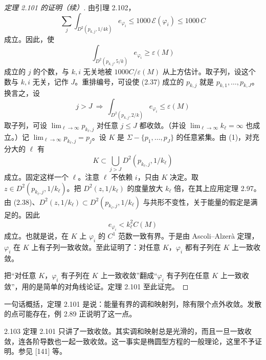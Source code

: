 \begin{proof}[定理 2.101 的证明（续）]
  由引理 2.102，
\[
  \sum_j\int_{D^2(p_{k,j},1/4k)}e_{\varphi_i}\le1000\,\mathcal{E}(\varphi_i)\le1000\,C
\]
成立。因此，使
\begin{equation}
  \int_{D^2(p_{k,j},5/k)}e_{\varphi_i}\ge\varepsilon(M) \tag{2.37}
\end{equation}
成立的 $j$ 的个数，与 $k,i$ 无关地被 $1000C/\varepsilon(M)$ 从上方估计。取子列，设这个数与 $k,i$ 无关，记作 $J$。重排编号，可设使 (2.37) 成立的 $p_{k,j}$ 就是 $p_{k,1},\dots,p_{k,J}$。换言之，设
\begin{equation}
  j>J\ \Longrightarrow\ \int_{D^2(p_{k,j},2/k)}e_{\varphi_i}\le\varepsilon(M) \tag{2.38}
\end{equation}
取子列，可设 $\lim_{\ell\to\infty}p_{k_\ell,j}$ 对任意 $j\le J$ 都收敛。（并设 $\lim_{\ell\to\infty}k_\ell=\infty$ 也成立。）记 $\lim_{\ell\to\infty}p_{k_\ell,j}=p_j$。设 $K$ 是 $\Sigma-\{p_1,\dots,p_J\}$ 的任意紧集。由 (1)，对充分大的 $\ell$ 有
\[
  K\subset\bigcup_{j>J}D^2(p_{k_\ell,j},1/k_\ell)
\]
成立。固定这样一个 $\ell$。注意 $\ell$ 不依赖 $i$，只由 $K$ 决定。取 $z\in D^2(p_{k_\ell,j},1/k_\ell)$。把 $D^2(z,1/k_\ell)$ 的度量放大 $k_\ell$ 倍，在其上应用定理 2.97。由 (2.38)、$D^2(z,1/k_\ell)\subset D^2(p_{k_\ell,j},1/k_\ell)$ 与共形不变性，关于能量的假定是满足的。因此
\[
  e_{\varphi_i}<k_\ell^2C(M)
\]
成立。也就是说，在 $K$ 上 $\varphi_i$ 的 $C^1$ 范数一致有界。于是由 Ascoli–Alzerà 定理，$\varphi_i$ 在 $K$ 上有子列一致收敛。至此证明了：对任意 $K$，$\varphi_i$ 都有子列在 $K$ 上一致收敛。


把“对任意 $K$，$\varphi_i$ 有子列在 $K$ 上一致收敛”翻成“$\varphi_i$ 有子列在任意 $K$ 上一致收敛”，用的是简单的对角线论证。定理 2.101 至此证完。
\end{proof}


一句话概括，定理 2.101 是说：能量有界的调和映射列，除有限个点外收敛。发散的点可能存在，例 2.89 正说明了这一点。

\begin{remark}{2.103}
  定理 2.101 只讲了一致收敛。其实调和映射总是光滑的，而且一旦一致收敛，连各阶导数也一起一致收敛。这一事实是椭圆型方程的一般理论，这里不予证明。参见 [141] 等。
\end{remark}

